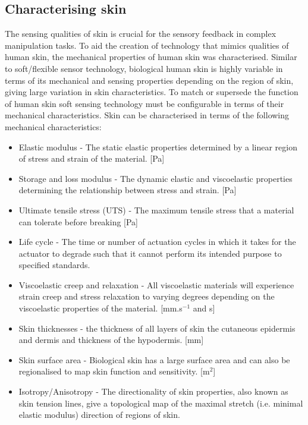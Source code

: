 \subsection{Characterising skin}
\label{subsec:Characterising skin}
The sensing qualities of skin is crucial for the sensory feedback in complex manipulation tasks. To aid the creation of technology that mimics qualities of human skin, the mechanical properties of human skin was characterised. Similar to soft/flexible sensor technology, biological human skin is highly variable in terms of its mechanical and sensing properties depending on the region of skin, giving large variation in skin characteristics. To match or supersede the function of human skin soft sensing technology must be configurable in terms of their mechanical characteristics. Skin can be characterised in terms of the following mechanical characteristics:
\begin{itemize}
    \item Elastic modulus -  The static elastic properties determined by a linear region of stress and strain of the material. [Pa]
    \item Storage and loss modulus - The dynamic elastic and viscoelastic properties determining the relationship between stress and strain. [Pa]
    \item Ultimate tensile stress (UTS) - The maximum tensile stress that a material can tolerate before breaking [Pa]
    \item Life cycle - The time or number of actuation cycles in which it takes for the actuator to degrade such that it cannot perform its intended purpose to specified standards.
    \item Viscoelastic creep and relaxation - All viscoelastic materials will experience strain creep and stress relaxation to varying degrees depending on the viscoelastic properties of the material. [mm.s$^{-1}$ and s]
    \item Skin thicknesses - the thickness of all layers of skin the cutaneous epidermis and dermis and thickness of the hypodermis. [mm]
    \item Skin surface area - Biological skin has a large surface area and can also be regionalised to map skin function and sensitivity. [m$^2$]
    \item Isotropy/Anisotropy - The directionality of skin properties, also known as skin tension lines, give a topological map of the maximal stretch (i.e. minimal elastic modulus) direction of regions of skin.
\end{itemize}
